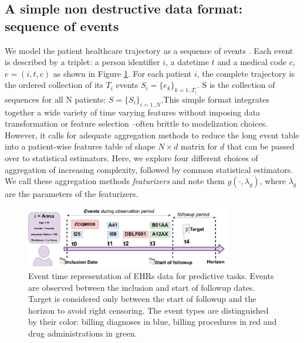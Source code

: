 \documentclass[french,12pt,twoside,a4paper]{book}
\begin{document}
\subsection{A simple non destructive data format: sequence of events}%
\label{subsec:predictive_models:event_format}%
We model the patient healthcare trajectory as a sequence of events
\citep{beam2019clinical, bacry2020scalpel3, chazard2022book}. Each event is
described by a triplet: a person identifier $i$, a datetime $t$ and a medical
code $c$, $e = (i, t, c)$ as shown in Figure \ref{fig:ehr_prediction_timeline}.
For each patient $i$, the complete trajectory is the ordered collection of its
$T_i$ events $S_i = \{e_k\}_{k=1..T_i}$. S is the collection of sequences for
all N patients: $S = \{S_i\}_{i=1..N}$.This simple format integrates together a
wide variety of time varying features without imposing data transformation or
feature selection --often brittle to modelization choices. However, it calls for
adequate aggregation methods to reduce the long event table into a patient-wise
features table of shape $N \times d$ matrix for $d$  that can be passed over to
statistical estimators.
Here, we explore four different choices of aggregation of increasing
complexity, followed by common statistical estimators. We call these aggregation
methods \emph{featurizers} and note them $g(\cdot, \lambda_g)$, where
$\lambda_g$ are the parameters of the featurizers.

\begin{figure}
  \centering
  \includegraphics[width=0.8\textwidth]{img/chapter_3/ehr_trajectory_predictive.pdf}
  \caption{Event time representation of EHRs data for predictive tasks. Events
    are observed between the inclusion and start of followup dates. Target is
    considered only between the start of followup and the horizon to avoid right
    censoring. The event types are distinguished by their color: billing
    diagnoses in blue, billing procedures in red and drug administrations in
    green.}\label{fig:ehr_prediction_timeline}
\end{figure}
\end{document}
